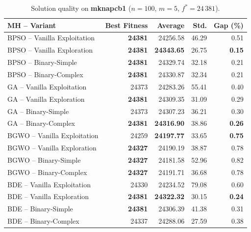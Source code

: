 \documentclass[journal,article,submit,moreauthors]{Definitions/mdpi}
\begin{document}
\begin{table}[htbp]
  \centering
  \small
  \caption{Solution quality on \textbf{mknapcb1}
  ($n=100$, $m=5$, $f^*=24\,381$).}
  \label{tab:calidad_mknapcb1}
  \begin{tabular}{lrrrr}
    \toprule
    \textbf{MH -- Variant} &
    \textbf{Best Fitness} &
    \textbf{Average} &
    \textbf{Std.} &
    \textbf{Gap (\%)} \\
    \midrule
    BPSO -- Vanilla Exploitation & \textbf{24381} & 24256.58 & 46.29 & 0.51 \\
    BPSO -- Vanilla Exploration  & \textbf{24381} & \textbf{24343.65} & 26.75 & \textbf{0.15} \\
    BPSO -- Binary-Simple        & \textbf{24381} & 24329.74 & 32.18 & 0.21 \\
    BPSO -- Binary-Complex       & \textbf{24381} & 24330.87 & 32.34 & 0.21 \\
    \midrule
    GA -- Vanilla Exploitation   & 24373 & 24283.26 & 55.41 & 0.40 \\
    GA -- Vanilla Exploration    & \textbf{24381} & 24309.35 & 31.09 & 0.29 \\
    GA -- Binary-Simple          & 24373 & 24307.23 & 36.21 & 0.30 \\
    GA -- Binary-Complex         & \textbf{24381} & \textbf{24316.90} & 38.86 & \textbf{0.26} \\
    \midrule
    BGWO -- Vanilla Exploitation & 24259 & \textbf{24197.77} & 33.65 & \textbf{0.75} \\
    BGWO -- Vanilla Exploration  & \textbf{24327} & 24190.19 & 38.87 & 0.78 \\
    BGWO -- Binary-Simple        & \textbf{24327} & 24181.58 & 52.96 & 0.82 \\
    BGWO -- Binary-Complex       & \textbf{24327} & 24191.71 & 36.68 & 0.78 \\
    \midrule
    BDE -- Vanilla Exploitation  & 24330 & 24234.52 & 79.08 & 0.60 \\
    BDE -- Vanilla Exploration   & \textbf{24381} & \textbf{24322.32} & 30.15 & \textbf{0.24} \\
    BDE -- Binary-Simple         & \textbf{24381} & 24306.39 & 41.38 & 0.31 \\
    BDE -- Binary-Complex        & 24337 & 24288.06 & 27.59 & 0.38 \\
    \bottomrule
  \end{tabular}
\end{table}
\end{document}
